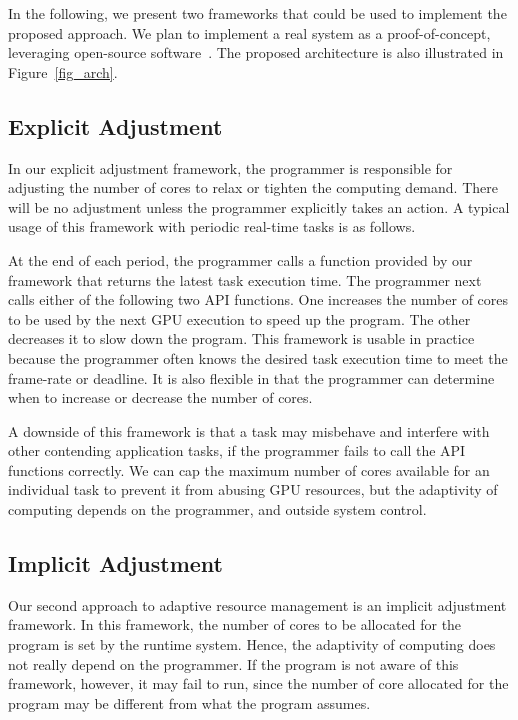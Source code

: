 \documentclass[times, 10pt, twocolumn]{article}
\begin{document}
In the following, we present two frameworks that could be used to 
implement the proposed approach. 
We plan to implement a real
system as a proof-of-concept, leveraging open-source
software~\cite{Kato_OSPERT11}. The proposed architecture is also 
illustrated in Figure~\ref{fig_arch}.

\subsection{Explicit Adjustment}

In our explicit adjustment framework, the programmer is
responsible for adjusting the number of cores to relax or tighten
the computing demand.
There will be no adjustment unless the programmer explicitly takes an
action.
A typical usage of this framework with periodic real-time tasks is as
follows.

At the end of each period, the programmer calls a function provided
by our framework that returns the latest task execution time.
The programmer next calls either of the following two API functions.
One increases the number of cores to be used by the next GPU execution 
to speed up the program.
The other decreases it to slow down the program.
This framework is usable in practice because the programmer often knows the
desired task execution time to meet the frame-rate or deadline.
It is also flexible in that the programmer can determine when to
increase or decrease the number of cores.

A downside of this framework is that a task may misbehave
and interfere with other contending application tasks, if the programmer
fails to call the API functions correctly.
We can cap the maximum number of cores available for an individual task
to prevent it from abusing GPU resources, but the adaptivity of computing
depends on the programmer, and outside system control.

\subsection{Implicit Adjustment}

Our second approach to adaptive resource management is an implicit
adjustment framework.
In this framework, the number of cores to be allocated for the program
is set by the runtime system.
Hence, the adaptivity of computing does not really depend on the programmer.
If the program is not aware of this framework, however, it may fail to
run, since the number of core allocated for the program may be different
from what the program assumes.
\end{document}
